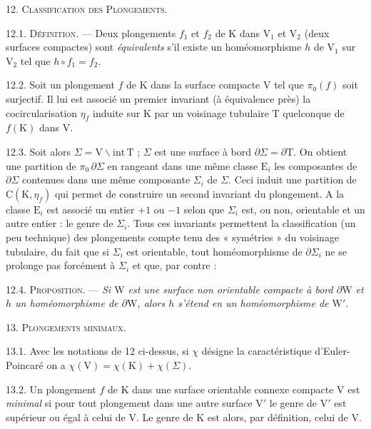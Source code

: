 12. \textsc{Classification des Plongements.}

12.1. \textsc{Définition.} --- Deux plongements \(f_1\) et \(f_2\) de \(\mathrm{K}\) dans \(\mathrm{V}_1\) et \(\mathrm{V}_2\) (deux surfaces compactes) sont \textit{équivalents} s'il existe un homéomorphisme \(h\) de \(\mathrm{V}_1\) sur \(\mathrm{V}_2\) tel que \(h\circ f_1=f_2\).

12.2. Soit un plongement \(f\) de \(\mathrm{K}\) dans la surface compacte \(\mathrm{V}\) tel que \(\pi_0(f)\) soit surjectif. Il lui est associé un premier invariant (à équivalence près) la cocircularisation \(\eta_f\) induite sur \(\mathrm{K}\) par un voisinage tubulaire \(\mathrm{T}\) quelconque de \(f(\mathrm{K})\) dans \(\mathrm{V}\).

12.3. Soit alors \(\Sigma=\mathrm{V}\backslash\mathrm{int}\,\mathrm{T}\) ; \(\Sigma\) est une surface à bord \(\partial\Sigma=\partial\mathrm{T}\). On obtient une partition de \(\pi_0\,\partial\Sigma\) en rangeant dans une même classe \(\mathrm{E}_i\) les composantes de \(\partial\Sigma\) contenues dans une même composante \(\Sigma_i\) de \(\Sigma\). Ceci induit une partition de \(\mathrm{C}(\mathrm{K},\eta_f)\) qui permet de construire un second invariant du plongement. A la classe \(\mathrm{E}_i\) est associé un entier \(+1\) ou \(-1\) selon que \(\Sigma_i\) est, ou non, orientable et un autre entier : le genre de \(\Sigma_i\). Tous ces invariants permettent la classification (un peu technique) des plongements compte tenu des « symétries » du voisinage tubulaire, du fait que si \(\Sigma_i\) est orientable, tout homéomorphisme de \(\partial\Sigma_i\) ne se prolonge pas forcément à \(\Sigma_i\) et que, par contre :

12.4. \textsc{Proposition.} --- \textit{Si \(\mathrm{W}\) est une surface \textup{non orientable} compacte à bord \(\partial\mathrm{W}\) et \(h\) un homéomorphisme de \(\partial\mathrm{W}\), alors \(h\) s'étend en un homéomorphisme de \(\mathrm{W}'\).}

13. \textsc{Plongements minimaux.}

13.1. Avec les notations de 12 ci-dessus, si \(\chi\) désigne la caractéristique d'Euler-Poincaré on a \(\chi(\mathrm{V})=\chi(\mathrm{K})+\chi(\Sigma)\).

13.2. Un plongement \(f\) de \(\mathrm{K}\) dans une surface orientable connexe compacte \(\mathrm{V}\) est \textit{minimal} si pour tout plongement dans une autre surface \(\mathrm{V}'\) le genre de \(\mathrm{V}'\) est supérieur ou égal à celui de \(\mathrm{V}\). Le genre de \(\mathrm{K}\) est alors, par définition, celui de \(\mathrm{V}\).

